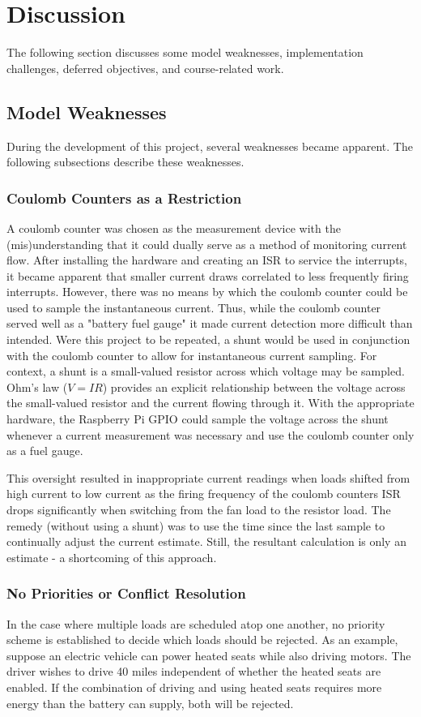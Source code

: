 \documentclass[11pt,conference,draftcls,onecolumn]{IEEEtran}
\begin{document}
\section{Discussion}\label{sec:discussion}
The following section discusses some model weaknesses, implementation challenges, deferred objectives, and course-related work.

\subsection{Model Weaknesses}
During the development of this project, several weaknesses became apparent.
The following subsections describe these weaknesses.

\subsubsection{Coulomb Counters as a Restriction}
A coulomb counter was chosen as the measurement device with the (mis)understanding that it could dually serve as a method of monitoring current flow.
After installing the hardware and creating an ISR to service the interrupts, it became apparent that smaller current draws correlated to less frequently firing interrupts.
However, there was no means by which the coulomb counter could be used to sample the instantaneous current.
Thus, while the coulomb counter served well as a "battery fuel gauge" it made current detection more difficult than intended.
Were this project to be repeated, a shunt would be used in conjunction with the coulomb counter to allow for instantaneous current sampling.
For context, a shunt is a small-valued resistor across which voltage may be sampled.
Ohm's law ($V=IR$) provides an explicit relationship between the voltage across the small-valued resistor and the current flowing through it.
With the appropriate hardware, the Raspberry Pi GPIO could sample the voltage across the shunt whenever a current measurement was necessary and use the coulomb counter only as a fuel gauge.

This oversight resulted in inappropriate current readings when loads shifted from high current to low current as the firing frequency of the coulomb counters ISR drops significantly when switching from the fan load to the resistor load.
The remedy (without using a shunt) was to use the time since the last sample to continually adjust the current estimate.
Still, the resultant calculation is only an estimate - a shortcoming of this approach.

\subsubsection{No Priorities or Conflict Resolution}
In the case where multiple loads are scheduled atop one another, no priority scheme is established to decide which loads should be rejected.
As an example, suppose an electric vehicle can power heated seats while also driving motors.
The driver wishes to drive 40 miles independent of whether the heated seats are enabled.
If the combination of driving and using heated seats requires more energy than the battery can supply, both will be rejected.
\end{document}
